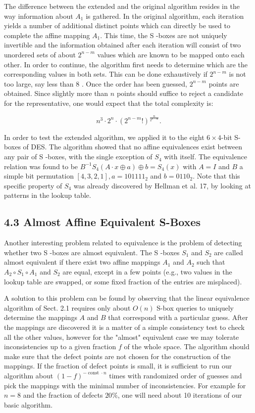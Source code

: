 \documentclass[10pt]{article}
\begin{document}
The difference between the extended and the original algorithm resides in the way information about $A_{1}$ is gathered. In the original algorithm, each iteration yields a number of additional distinct points which can directly be used to complete the affine mapping $A_{1}$. This time, the S -boxes are not uniquely invertible and the information obtained after each iteration will consist of two unordered sets of about $2^{n-m}$ values which are known to be mapped onto each other. In order to continue, the algorithm first needs to determine which are the corresponding values in both sets. This can be done exhaustively if $2^{n-m}$ is not too large, say less than 8 . Once the order has been guessed, $2^{n-m}$ points are obtained. Since slightly more than $n$ points should suffice to reject a candidate for the representative, one would expect that the total complexity is:


\begin{equation*}
n^{3} \cdot 2^{n} \cdot\left(2^{n-m}!\right)^{\frac{n}{2^{n-m}}} . \tag{9}
\end{equation*}


In order to test the extended algorithm, we applied it to the eight $6 \times 4$-bit S-boxes of DES. The algorithm showed that no affine equivalences exist between any pair of S -boxes, with the single exception of $S_{4}$ with itself. The equivalence relation was found to be $B^{-1} S_{4}(A \cdot x \oplus a) \oplus b=S_{4}(x)$ with $A=I$ and $B$ a simple bit permutation $[4,3,2,1], a=101111_{2}$ and $b=0110_{2}$. Note that this specific property of $S_{4}$ was already discovered by Hellman et al. 17, by looking at patterns in the lookup table.

\subsection*{4.3 Almost Affine Equivalent S-Boxes}
Another interesting problem related to equivalence is the problem of detecting whether two S -boxes are almost equivalent. The S -boxes $S_{1}$ and $S_{2}$ are called almost equivalent if there exist two affine mappings $A_{1}$ and $A_{2}$ such that $A_{2} \circ S_{1} \circ A_{1}$ and $S_{2}$ are equal, except in a few points (e.g., two values in the lookup table are swapped, or some fixed fraction of the entries are misplaced).

A solution to this problem can be found by observing that the linear equivalence algorithm of Sect. 2.1 requires only about $O(n)$ S-box queries to uniquely determine the mappings $A$ and $B$ that correspond with a particular guess. After the mappings are discovered it is a matter of a simple consistency test to check all the other values, however for the "almost" equivalent case we may tolerate inconsistencies up to a given fraction $f$ of the whole space. The algorithm should make sure that the defect points are not chosen for the construction of the mappings. If the fraction of defect points is small, it is sufficient to run our algorithm about $(1-f)^{-\operatorname{const} \cdot n}$ times with randomized order of guesses and pick the mappings with the minimal number of inconsistencies. For example for $n=8$ and the fraction of defects $20 \%$, one will need about 10 iterations of our basic algorithm.
\end{document}
